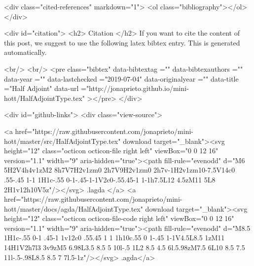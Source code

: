   <div class="cited-references" markdown="1">
  <ol class="bibliography"></ol>
  </div>


  
  <div id="citation">
  <h2> Citation </h2>
  If you want to cite the content of this post,
  we suggest to use the following latex bibtex entry.
  This is generated automatically.

  <br/>
  <br/>
  <pre class="bibtex"
       data-bibtextag =""
       data-bibtexauthors =""
       data-year =""
       data-lastchecked ="2019-07-04"
       data-originalyear =""
       data-title ="Half Adjoint"
       data-url ="http://jonaprieto.github.io/mini-hott/HalfAdjointType.tex"
  ></pre>
  </div>
  

  <div id="github-links">
    <div class="view-source">
      
        <a href="https://raw.githubusercontent.com/jonaprieto/mini-hott/master/src/HalfAdjointType.tex" download target="_blank"><svg height="12" class="octicon octicon-file right left" viewBox="0 0 12 16" version="1.1" width="9" aria-hidden="true"><path fill-rule="evenodd" d="M6 5H2V4h4v1zM2 8h7V7H2v1zm0 2h7V9H2v1zm0 2h7v-1H2v1zm10-7.5V14c0 .55-.45 1-1 1H1c-.55 0-1-.45-1-1V2c0-.55.45-1 1-1h7.5L12 4.5zM11 5L8 2H1v12h10V5z"/></svg> .lagda </a>
        <a href="https://raw.githubusercontent.com/jonaprieto/mini-hott/master/docs/agda/HalfAdjointType.tex" download target="_blank"><svg height="12" class="octicon octicon-file-code right left" viewBox="0 0 12 16" version="1.1" width="9" aria-hidden="true"><path fill-rule="evenodd" d="M8.5 1H1c-.55 0-1 .45-1 1v12c0 .55.45 1 1 1h10c.55 0 1-.45 1-1V4.5L8.5 1zM11 14H1V2h7l3 3v9zM5 6.98L3.5 8.5 5 10l-.5 1L2 8.5 4.5 6l.5.98zM7.5 6L10 8.5 7.5 11l-.5-.98L8.5 8.5 7 7l.5-1z"/></svg> .agda</a>
      
